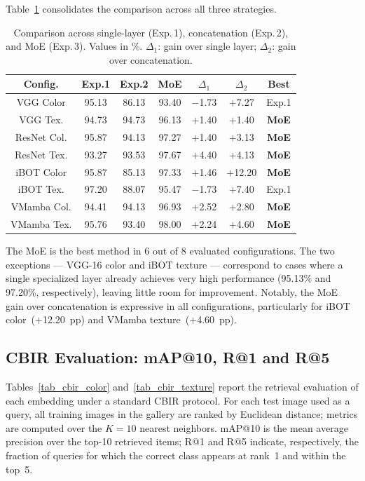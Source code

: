 \documentclass[conference]{IEEEtran}
\begin{document}
Table~\ref{tab_comparacao} consolidates the comparison across all three
strategies.

\begin{table}[htbp]
\caption{Comparison across single-layer (Exp.\,1), concatenation
         (Exp.\,2), and MoE (Exp.\,3). Values in \%. $\Delta_1$: gain
         over single layer; $\Delta_2$: gain over concatenation.}
\begin{center}
\begin{tabular}{c|c|c|c|c|c|c}
\hline
\textbf{Config.} & \textbf{Exp.1} & \textbf{Exp.2}
                 & \textbf{MoE} & \textbf{$\Delta_1$}
                 & \textbf{$\Delta_2$} & \textbf{Best} \\
\hline
VGG Color   & 95.13 & 86.13 & 93.40 & $-$1.73 & $+$7.27  & Exp.1 \\
VGG Tex.    & 94.73 & 94.73 & 96.13 & $+$1.40 & $+$1.40  & \textbf{MoE} \\
ResNet Col. & 95.87 & 94.13 & 97.27 & $+$1.40 & $+$3.13  & \textbf{MoE} \\
ResNet Tex. & 93.27 & 93.53 & 97.67 & $+$4.40 & $+$4.13  & \textbf{MoE} \\
iBOT Color  & 95.87 & 85.13 & 97.33 & $+$1.46 & $+$12.20 & \textbf{MoE} \\
iBOT Tex.   & 97.20 & 88.07 & 95.47 & $-$1.73 & $+$7.40  & Exp.1 \\
VMamba Col. & 94.41 & 94.13 & 96.93 & $+$2.52 & $+$2.80  & \textbf{MoE} \\
VMamba Tex. & 95.76 & 93.40 & 98.00 & $+$2.24 & $+$4.60  & \textbf{MoE} \\
\hline
\end{tabular}
\label{tab_comparacao}
\end{center}
\end{table}

The MoE is the best method in 6 out of 8 evaluated configurations.
The two exceptions — VGG-16 color and iBOT texture — correspond to cases
where a single specialized layer already achieves very high performance
(95.13\% and 97.20\%, respectively), leaving little room for improvement.
Notably, the MoE gain over concatenation is expressive in all
configurations, particularly for iBOT color~($+$12.20~pp) and VMamba
texture~($+$4.60~pp).

\subsection{CBIR Evaluation: mAP@10, R@1 and R@5}

Tables~\ref{tab_cbir_color} and~\ref{tab_cbir_texture} report the
retrieval evaluation of each embedding under a standard CBIR protocol.
For each test image used as a query, all training images in the gallery
are ranked by Euclidean distance; metrics are computed over the
$K\!=\!10$ nearest neighbors.
mAP@10 is the mean average precision over the top-10 retrieved items;
R@1 and R@5 indicate, respectively, the fraction of queries for which
the correct class appears at rank~1 and within the top~5.
\end{document}
